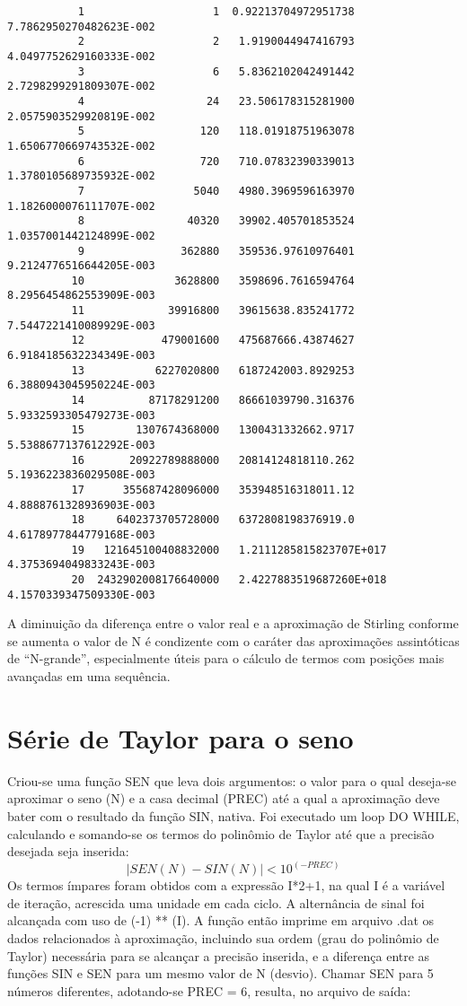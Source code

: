 \documentclass{article}
\begin{document}
\begin{lstlisting}
           1                    1  0.92213704972951738        7.7862950270482623E-002
           2                    2   1.9190044947416793        4.0497752629160333E-002
           3                    6   5.8362102042491442        2.7298299291809307E-002
           4                   24   23.506178315281900        2.0575903529920819E-002
           5                  120   118.01918751963078        1.6506770669743532E-002
           6                  720   710.07832390339013        1.3780105689735932E-002
           7                 5040   4980.3969596163970        1.1826000076111707E-002
           8                40320   39902.405701853524        1.0357001442124899E-002
           9               362880   359536.97610976401        9.2124776516644205E-003
          10              3628800   3598696.7616594764        8.2956454862553909E-003
          11             39916800   39615638.835241772        7.5447221410089929E-003
          12            479001600   475687666.43874627        6.9184185632234349E-003
          13           6227020800   6187242003.8929253        6.3880943045950224E-003
          14          87178291200   86661039790.316376        5.9332593305479273E-003
          15        1307674368000   1300431332662.9717        5.5388677137612292E-003
          16       20922789888000   20814124818110.262        5.1936223836029508E-003
          17      355687428096000   353948516318011.12        4.8888761328936903E-003
          18     6402373705728000   6372808198376919.0        4.6178977844779168E-003
          19   121645100408832000   1.2111285815823707E+017   4.3753694049833243E-003
          20  2432902008176640000   2.4227883519687260E+018   4.1570339347509330E-003
\end{lstlisting}
A diminuição da diferença entre o valor real e a aproximação de Stirling conforme se aumenta o valor de N é condizente com o caráter das aproximações assintóticas de ``N-grande'', especialmente úteis para o cálculo de termos com posições mais avançadas em uma sequência.
\section{Série de Taylor para o seno}

Criou-se uma função SEN que leva dois argumentos: o valor para o qual deseja-se aproximar o seno (N) e a casa decimal (PREC) até a qual a aproximação deve bater com o resultado da função SIN, nativa.
Foi executado um loop DO WHILE, calculando e somando-se os termos do polinômio de Taylor até que a precisão desejada seja inserida:
\[|SEN(N) - SIN(N)| < 10^{(-PREC)}\]
Os termos ímpares foram obtidos com a expressão I*2+1, na qual I é a variável de iteração, acrescida uma unidade em cada ciclo. A alternância de sinal foi alcançada com uso de (-1) ** (I).
A função então imprime em arquivo .dat os dados relacionados à aproximação, incluindo sua ordem (grau do polinômio de Taylor) necessária para se alcançar a precisão inserida, e a diferença entre as funções SIN e SEN para um mesmo valor de N (desvio). Chamar SEN para 5 números diferentes, adotando-se PREC = 6, resulta, no arquivo de saída:
\end{document}
